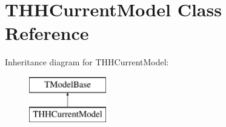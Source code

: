 \hypertarget{class_t_h_h_current_model}{\section{T\+H\+H\+Current\+Model Class Reference}
\label{class_t_h_h_current_model}
}
Inheritance diagram for T\+H\+H\+Current\+Model\+:\begin{figure}[H]
\begin{center}
\leavevmode
\includegraphics[height=2.000000cm]{class_t_h_h_current_model}
\end{center}
\end{figure}

